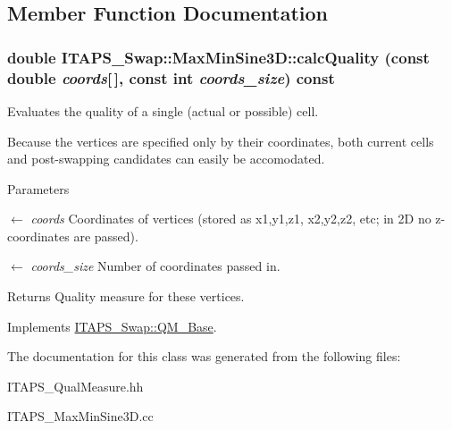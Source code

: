 \subsection{Member Function Documentation}
\hypertarget{class_i_t_a_p_s___swap_1_1_max_min_sine3_d_a4856dd6b9712f90d6327f1c651b90471}{
\subsubsection[{calcQuality}]{\setlength{\rightskip}{0pt plus 5cm}double ITAPS\_\-Swap::MaxMinSine3D::calcQuality (const double {\em coords}\mbox{[}$\,$\mbox{]}, \/  const int {\em coords\_\-size}) const}}
\label{class_i_t_a_p_s___swap_1_1_max_min_sine3_d_a4856dd6b9712f90d6327f1c651b90471}


Evaluates the quality of a single (actual or possible) cell. 

Because the vertices are specified only by their coordinates, both current cells and post-\/swapping candidates can easily be accomodated.


\begin{DoxyParams}{Parameters}
\item[\mbox{$\leftarrow$} {\em coords}]Coordinates of vertices (stored as x1,y1,z1, x2,y2,z2, etc; in 2D no z-\/coordinates are passed).\item[\mbox{$\leftarrow$} {\em coords\_\-size}]Number of coordinates passed in.\end{DoxyParams}
\begin{DoxyReturn}{Returns}
Quality measure for these vertices. 
\end{DoxyReturn}


Implements \hyperlink{class_i_t_a_p_s___swap_1_1_q_m___base_aea047b3afc06b75a1115bbaddd8286ee}{ITAPS\_\-Swap::QM\_\-Base}.



The documentation for this class was generated from the following files:\begin{DoxyCompactItemize}
\item 
ITAPS\_\-QualMeasure.hh\item 
ITAPS\_\-MaxMinSine3D.cc\end{DoxyCompactItemize}
